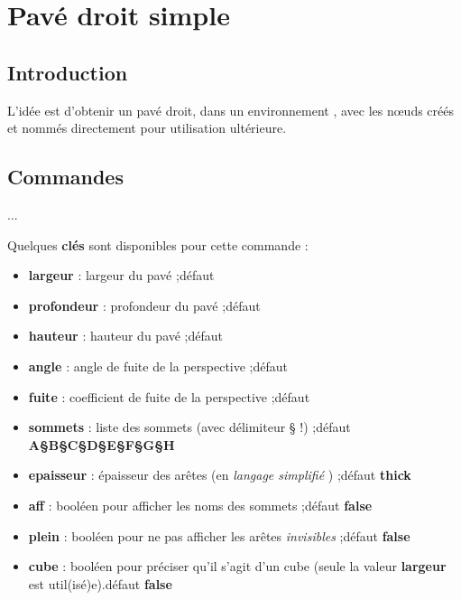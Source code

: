 \documentclass{article}
\newcommand\Cle[1]{{\bfseries\sffamily\textlangle #1\textrangle}}
\begin{document}
\section{Pavé droit \og simple \fg}\label{pave}

\subsection{Introduction}

\begin{codeidee}
L'idée est d'obtenir un pavé droit, dans un environnement \TikZ, avec les nœuds créés et nommés directement pour utilisation ultérieure.
\end{codeidee}

\subsection{Commandes}

\begin{codetex}
...
\end{codetex}

\begin{codecles}
Quelques \Cle{clés} sont disponibles pour cette commande :

\begin{itemize}
	\item \Cle{largeur} : largeur du pavé ;\hfill{}défaut \Cle{2}
	\item \Cle{profondeur} : profondeur du pavé ;\hfill{}défaut \Cle{1}
	\item \Cle{hauteur} : hauteur du pavé ;\hfill{}défaut \Cle{1.25}
	\item \Cle{angle} : angle de fuite de la perspective ;\hfill{}défaut \Cle{30}
	\item \Cle{fuite} : coefficient de fuite de la perspective ;\hfill{}défaut \Cle{0.5}
	\item \Cle{sommets} : liste des sommets (avec délimiteur § !) ;\hfill{}défaut \Cle{A§B§C§D§E§F§G§H}
	\item \Cle{epaisseur} : épaisseur des arêtes (en \textit{langage simplifié} \TikZ) ;\hfill{}défaut \Cle{thick}
	\item \Cle{aff} : booléen pour afficher les noms des sommets ;\hfill{}défaut \Cle{false}
	\item \Cle{plein} : booléen pour ne pas afficher les arêtes \textit{invisibles} ;\hfill{}défaut \Cle{false}
	\item \Cle{cube} : booléen pour préciser qu'il s'agit d'un cube (seule la valeur \Cle{largeur} est util(isé)e).\hfill{}défaut \Cle{false}
\end{itemize}
\end{codecles}
\end{document}
